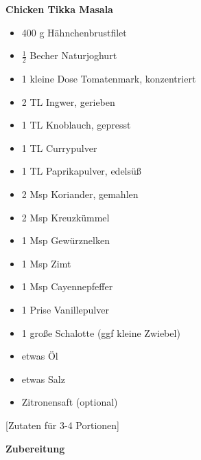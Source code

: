 


\parindent0pt	

\pagestyle{empty}


\textbf{{\LARGE Chicken Tikka Masala}}%

\hrulefill
\vspace*{\fill}
\begin{multicols}{2}	
\begin{itemize}
\item 400 g 	Hähnchenbrustfilet
\item $\frac{1}{2}$  Becher Naturjoghurt
\item 1 kleine Dose Tomatenmark, konzentriert
\item 2 TL Ingwer, gerieben
\item 1 TL Knoblauch, gepresst
\item 1 TL Currypulver
\item 1 TL Paprikapulver, edelsüß
\item 2 Msp Koriander, gemahlen
\item 2 Msp Kreuzkümmel
\item 1 Msp Gewürznelken
\item 1 Msp Zimt
\item 1 Msp Cayennepfeffer
\item 1 Prise Vanillepulver
\item 1 große Schalotte (ggf kleine Zwiebel)
\item etwas Öl
\item etwas Salz
\item Zitronensaft (optional)
\end{itemize}
\vfill									
\end{multicols}
\begin{center}			%
[Zutaten für 3-4 Portionen]%
\end{center}


\vfill
\newpage
\textbf{{\LARGE Zubereitung}}%

\hrulefill

